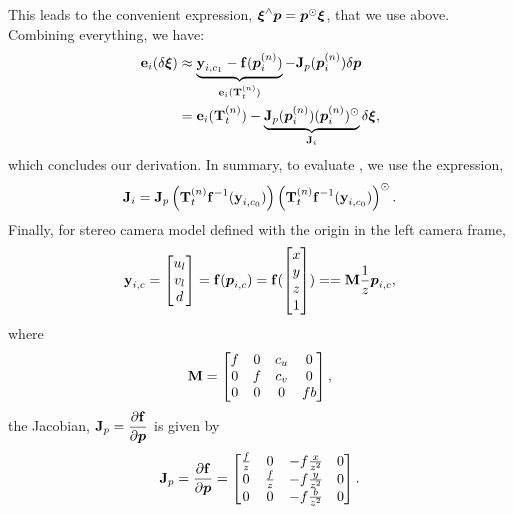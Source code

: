 This leads to the convenient expression, $\boldsymbol{\mathbf{\xi}}^\wedge \boldsymbol{p} = \boldsymbol{p}^\odot \boldsymbol{\mathbf{\xi}}$, that we use above.
Combining everything, we have:
\begin{align}
	\boldsymbol{\mathbf{e}}_i (\delta \boldsymbol{\mathbf{\xi}})  &\approx \underbrace{\boldsymbol{\mathbf{y}}_{i, c_1} -  \boldsymbol{\mathbf{f}}(\boldsymbol{p}_i^{(n)})}_{\boldsymbol{\mathbf{e}}_i(\boldsymbol{\mathbf{T}}_t^{(n)})} -  \boldsymbol{\mathbf{J}}_p(\boldsymbol{p}_i^{(n)})  \delta \boldsymbol{p}  \\
	&=  \boldsymbol{\mathbf{e}}_i(\boldsymbol{\mathbf{T}}_t^{(n)}) - \underbrace{\boldsymbol{\mathbf{J}}_p(\boldsymbol{p}_i^{(n)}) (\boldsymbol{p}_i^{(n)})^\odot}_{\boldsymbol{\mathbf{J}}_i} \delta\boldsymbol{\mathbf{\xi}}, 
\end{align}
which concludes our derivation. In summary, to evaluate , we use the expression,
\begin{equation}
\boldsymbol{\mathbf{J}}_i = \boldsymbol{\mathbf{J}}_p\left( \boldsymbol{\mathbf{T}}_t^{(n)} 
    \boldsymbol{\mathbf{f}}^{-1}(\boldsymbol{\mathbf{y}}_{i, c_0})\right) \left( \boldsymbol{\mathbf{T}}_t^{(n)} 
    \boldsymbol{\mathbf{f}}^{-1}(\boldsymbol{\mathbf{y}}_{i, c_0})\right)^\odot.	
\end{equation}
Finally, for stereo camera model defined with the origin in the left camera frame,
 \begin{equation}
	\boldsymbol{\mathbf{y}}_{i, c} = \begin{bmatrix} u_l \\ v_l \\ d  \end{bmatrix}  
  =\boldsymbol{\mathbf{f}}(\boldsymbol{p}_{i,c}) =  \boldsymbol{\mathbf{f}}(\begin{bmatrix} x \\ y \\ z \\ 1 \end{bmatrix}) = 
  = \boldsymbol{\mathbf{M}} \frac{1}{z} \boldsymbol{p}_{i,c},
\end{equation}
where
\begin{equation}
\boldsymbol{\mathbf{M}} = \begin{bmatrix} f & 0 & c_u & 0 \\ 0 & f & c_v & 0 \\ 0 & 0 & 0 & fb \end{bmatrix},
\end{equation}
the Jacobian, $\boldsymbol{\mathbf{J}}_p = \dfrac{\partial \boldsymbol{\mathbf{f}}}{\partial \boldsymbol{p}}$ is given by
\begin{equation}
\boldsymbol{\mathbf{J}}_p = \dfrac{\partial \boldsymbol{\mathbf{f}}}{\partial \boldsymbol{p}} = \begin{bmatrix} \frac{f}{z} & 0 & -f \frac{x}{z^2} & 0 \\ 0 & \frac{f}{z} & -f \frac{y}{z^2} & 0 \\ 0 & 0 & -f \frac{b}{z^2} & 0 \end{bmatrix}.
\end{equation}




 